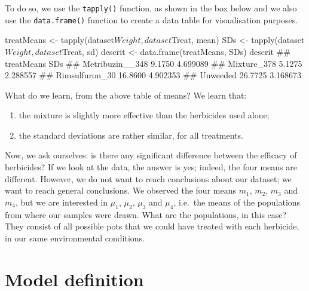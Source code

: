 \documentclass[a4paper,12pt,oneside]{book}
\providecommand{\tightlist}{%
  \setlength{\itemsep}{0pt}\setlength{\parskip}{0pt}}
\newenvironment{Shaded}{\begin{snugshade}}{\end{snugshade}}
\newcommand{\SpecialCharTok}[1]{#1}
\newcommand{\DocumentationTok}[1]{#1}
\newcommand{\OtherTok}[1]{#1}
\newcommand{\FunctionTok}[1]{#1}
\newcommand{\NormalTok}[1]{#1}
\begin{document}
To do so, we use the \texttt{tapply()} function, as shown in the box below and we also use the \texttt{data.frame()} function to create a data table for visualisation purposes.

\vspace{12pt}

\begin{Shaded}
\begin{Highlighting}[]
\NormalTok{treatMeans }\OtherTok{\textless{}{-}} \FunctionTok{tapply}\NormalTok{(dataset}\SpecialCharTok{$}\NormalTok{Weight, dataset}\SpecialCharTok{$}\NormalTok{Treat, mean)}
\NormalTok{SDs }\OtherTok{\textless{}{-}} \FunctionTok{tapply}\NormalTok{(dataset}\SpecialCharTok{$}\NormalTok{Weight, dataset}\SpecialCharTok{$}\NormalTok{Treat, sd)}
\NormalTok{descrit }\OtherTok{\textless{}{-}} \FunctionTok{data.frame}\NormalTok{(treatMeans, SDs)}
\NormalTok{descrit}
\DocumentationTok{\#\#                 treatMeans      SDs}
\DocumentationTok{\#\# Metribuzin\_\_348     9.1750 4.699089}
\DocumentationTok{\#\# Mixture\_378         5.1275 2.288557}
\DocumentationTok{\#\# Rimsulfuron\_30     16.8600 4.902353}
\DocumentationTok{\#\# Unweeded           26.7725 3.168673}
\end{Highlighting}
\end{Shaded}

What do we learn, from the above table of means? We learn that:

\begin{enumerate}
\def\labelenumi{\arabic{enumi}.}
\tightlist
\item
  the mixture is slightly more effective than the herbicides used alone;
\item
  the standard deviations are rather similar, for all treatments.
\end{enumerate}

Now, we ask ourselves: is there any significant difference between the efficacy of herbicides? If we look at the data, the answer is yes; indeed, the four means are different. However, we do not want to reach conclusions about our dataset; we want to reach general conclusions. We observed the four means \(m_1\), \(m_2\), \(m_3\) and \(m_4\), but we are interested in \(\mu_1\), \(\mu_2\), \(\mu_3\) and \(\mu_4\), i.e.~the means of the populations from where our samples were drawn. What are the populations, in this case? They consist of all possible pots that we could have treated with each herbicide, in our same environmental conditions.

\hypertarget{model-definition}{%
\section{Model definition}\label{model-definition}}
\end{document}
